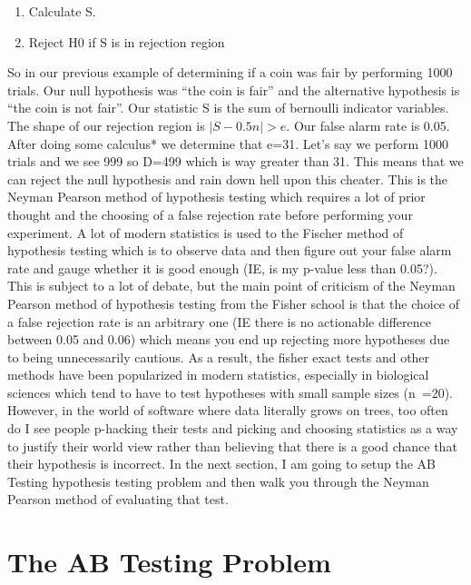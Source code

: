 \documentclass[12pt]{report}
\begin{document}
\begin{enumerate}
\item Calculate S.
\item Reject H0 if S is in rejection region
\end{enumerate}

So in our previous example of determining if a coin was fair by performing 1000 trials. Our null hypothesis was “the coin is fair” and the 
alternative hypothesis is “the coin is not fair”. Our statistic S is the sum of bernoulli indicator variables. The shape of our rejection 
region is $|S-0.5n|>e$. Our false alarm rate is 0.05. After doing some calculus* we determine that e=31. Let’s say we perform 1000 trials 
and we see 999 so D=499 which is way greater than 31. This means that we can reject the null hypothesis and rain down hell upon this cheater. 
This is the Neyman Pearson method of hypothesis testing which requires a lot of prior thought and the choosing of a false rejection rate 
before performing your experiment. A lot of modern statistics is used to the Fischer method of hypothesis testing which is to observe data 
and then figure out your false alarm rate and gauge whether it is good enough (IE, is my p-value less than 0.05?). 
This is subject to a lot of debate, but the main point of criticism of the Neyman Pearson method of hypothesis testing from the Fisher school 
is that the choice of a false rejection rate is an arbitrary one (IE there is no actionable difference between 0.05 and 0.06) which means you 
end up rejecting more hypotheses due to being unnecessarily cautious. As a result, the fisher exact tests and other methods have been 
popularized in modern statistics, especially in biological sciences which tend to have to test hypotheses with small sample sizes (n~=20). 
However, in the world of software where data literally grows on trees, too often do I see people p-hacking their tests and picking and choosing 
statistics as a way to justify their world view rather than believing that there is a good chance that their hypothesis is incorrect. 
In the next section, I am going to setup the AB Testing hypothesis testing problem and then walk you through the Neyman Pearson method 
of evaluating that test.


\section{The AB Testing Problem}
\end{document}
